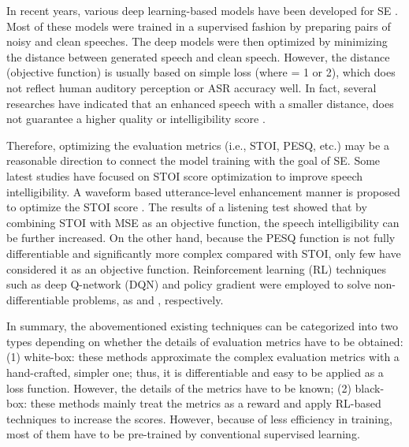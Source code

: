 \documentclass{article}
\begin{document}
In recent years, various deep learning-based models have been developed for SE \cite{lu2013speech,xu2014experimental,wang2014training,xu2015regression, ochiai2017multichannel,luo2018tasnet,grais2018raw,germain2018speech,chai2018error, choi2018phase}. Most of these models were trained in a supervised fashion by preparing pairs of noisy and clean speeches. The deep models were then optimized by minimizing the distance between generated speech and clean speech. However, the distance (objective function) is usually based on simple  loss (where  = 1 or 2), which does not reflect human auditory perception or ASR  accuracy  \cite{bagchi2018spectral} well. In fact, several researches have indicated that an enhanced speech with a smaller  distance, does not guarantee a higher quality or intelligibility score \cite{fu2018end,koizumi2018dnn}.



Therefore, optimizing the evaluation metrics (i.e., STOI, PESQ, etc.) may be a reasonable direction to connect the model training with the goal of SE. Some latest studies \cite{fu2018end,koizumi2018dnn,zhang2018training,zhao2018perceptually,naithani2018deep, kolbaek2018monaural, venkataramani2018performance,venkataramani2018end,zhao2018convolutional} have focused on STOI score optimization to improve speech intelligibility. A waveform based utterance-level enhancement manner is proposed to optimize the STOI score \cite{fu2018end}. The results of a listening test showed that by combining STOI with MSE as an objective function, the speech intelligibility can be further increased. On the other hand, because the PESQ function is not fully differentiable and significantly more complex compared with STOI, only few \cite{koizumi2018dnn,zhang2018training,koizumi2017dnn, martin2018deep} have considered it as an objective function. Reinforcement learning (RL) techniques such as deep Q-network (DQN) and policy gradient were employed to solve non-differentiable  problems, as \cite{koizumi2017dnn} and \cite{koizumi2018dnn}, respectively. 



In summary, the abovementioned existing techniques can be categorized into two types depending on whether the details of evaluation metrics have to be obtained: (1) white-box: these methods approximate the complex evaluation metrics with a hand-crafted, simpler one; thus, it is differentiable and easy to be applied as a loss function. However, the details of the metrics have to be known; (2) black-box: these methods mainly treat the metrics as a reward and apply RL-based techniques to increase the scores. However, because of less efficiency in training, most of them have to be pre-trained by conventional supervised learning.
 
\end{document}
